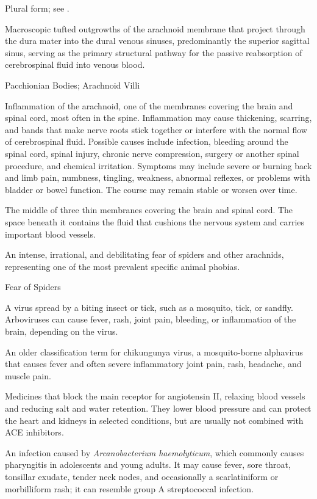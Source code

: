  Plural form; see .

 Macroscopic tufted outgrowths of the arachnoid membrane that project through the dura mater into the dural venous sinuses, predominantly the superior sagittal sinus, serving as the primary structural pathway for the passive reabsorption of cerebrospinal fluid into venous blood.

\synonyms
Pacchionian Bodies; Arachnoid Villi

 Inflammation of the arachnoid, one of the membranes covering the brain and spinal cord, most often in the spine. Inflammation may cause thickening, scarring, and bands that make nerve roots stick together or interfere with the normal flow of cerebrospinal fluid. Possible causes include infection, bleeding around the spinal cord, spinal injury, chronic nerve compression, surgery or another spinal procedure, and chemical irritation. Symptoms may include severe or burning back and limb pain, numbness, tingling, weakness, abnormal reflexes, or problems with bladder or bowel function. The course may remain stable or worsen over time.

 The middle of three thin membranes covering the brain and spinal cord. The space beneath it contains the fluid that cushions the nervous system and carries important blood vessels.

 An intense, irrational, and debilitating fear of spiders and other arachnids, representing one of the most prevalent specific animal phobias.

\synonyms
Fear of Spiders

 A virus spread by a biting insect or tick, such as a mosquito, tick, or sandfly. Arboviruses can cause fever, rash, joint pain, bleeding, or inflammation of the brain, depending on the virus.

 An older classification term for chikungunya virus, a mosquito-borne alphavirus that causes fever and often severe inflammatory joint pain, rash, headache, and muscle pain.

 Medicines that block the main receptor for angiotensin II, relaxing blood vessels and reducing salt and water retention. They lower blood pressure and can protect the heart and kidneys in selected conditions, but are usually not combined with ACE inhibitors.

 An infection caused by
\textit{Arcanobacterium haemolyticum}, which commonly causes pharyngitis in adolescents and
young adults. It may cause fever, sore throat, tonsillar exudate, tender neck nodes, and
occasionally a scarlatiniform or morbilliform rash; it can resemble group A streptococcal
infection.

